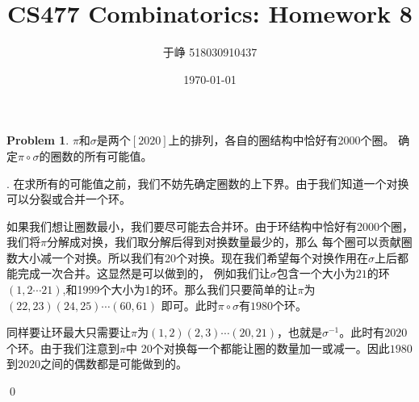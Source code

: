 \documentclass[UTF8]{ctexart}
\newenvironment{sol}
  {\par\vspace{3mm}\noindent{\it Solution}.}
  {\qed \\ \medskip}
\theoremstyle{definition}
\newtheorem{problem}{Problem}
\begin{document}
\title{CS477 Combinatorics: Homework 8}
\author{于峥 518030910437}
\date{\today}

\maketitle

\begin{problem}
$\pi$和$\sigma$是两个$[2020]$上的排列，各自的圈结构中恰好有2000个圈。
确定$\pi \circ \sigma$的圈数的所有可能值。
\begin{sol}
  在求所有的可能值之前，我们不妨先确定圈数的上下界。由于我们知道一个对换可以分裂或合并一个环。
  
  如果我们想让圈数最小，我们要尽可能去合并环。由于环结构中恰好有2000个圈，我们将$\pi$分解成对换，我们取分解后得到对换数量最少的，那么
  每个圈可以贡献圈数大小减一个对换。所以我们有20个对换。现在我们希望每个对换作用在$\sigma$上后都能完成一次合并。这显然是可以做到的，
  例如我们让$\sigma$包含一个大小为$21$的环$(1,2\cdots 21)$,和1999个大小为1的环。那么我们只要简单的让$\pi$为$(22,23)(24,25)\cdots(60, 61)$
  即可。此时$\pi\circ\sigma$有$1980$个环。
  
  同样要让环最大只需要让$\pi$为$(1,2)(2,3)\cdots(20,21)$，也就是$\sigma^{-1}$。此时有$2020$个环。由于我们注意到$\pi$中
  20个对换每一个都能让圈的数量加一或减一。因此$1980$到$2020$之间的偶数都是可能做到的。
  
\end{sol}
\end{problem}
\end{document}
